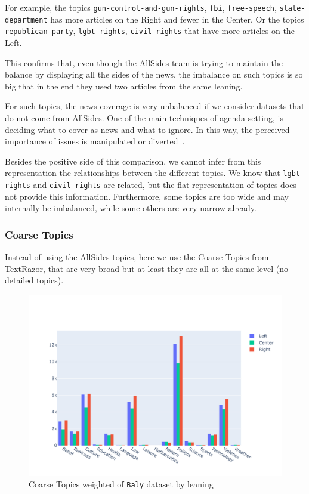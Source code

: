 For example, the topics \texttt{gun-control-and-gun-rights}, \texttt{fbi}, \texttt{free-speech}, \texttt{state-department} has more articles on the Right and fewer in the Center. Or the topics \texttt{republican-party}, \texttt{lgbt-rights}, \texttt{civil-rights} that have more articles on the Left.

This confirms that, even though the AllSides team is trying to maintain the balance by displaying all the sides of the news, the imbalance on such topics is so big that in the end they used two articles from the same leaning.

For such topics, the news coverage is very unbalanced if we consider datasets that do not come from AllSides.
One of the main techniques of agenda setting, is deciding what to cover as news and what to ignore. In this way, the perceived importance of issues is manipulated or diverted~\cite{mccombs1972agenda}.

Besides the positive side of this comparison, we cannot infer from this representation the relationships between the different topics.
We know that \texttt{lgbt-rights} and \texttt{civil-rights} are related, but the flat representation of topics does not provide this information.
Furthermore, some topics are too wide and may internally be imbalanced, while some others are very narrow already.

\subsubsection{\statusgreen Coarse Topics}

Instead of using the AllSides topics, here we use the Coarse Topics from TextRazor, that are very broad but at least they are all at the same level (no detailed topics).

\begin{figure}[!htbp]
    \centering
    \includegraphics[width=\linewidth]{figures/baly_coarse_weighted_by_leaning.pdf}
    \caption{Coarse Topics weighted of \texttt{Baly} dataset by leaning}
    \label{fig:baly_coarse_weighted_by_leaning}
\end{figure}

